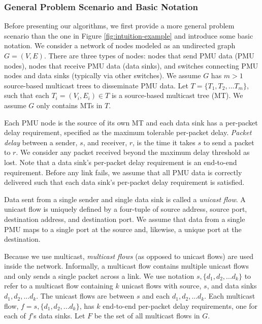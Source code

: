 \subsubsection{General Problem Scenario and Basic Notation}

Before presenting our algorithms, we first provide a more general problem scenario than the one in Figure \ref{fig:intuition-example} and introduce some basic notation.
We consider a network of nodes modeled as an undirected graph $G=(V,E)$.  There are three types of nodes:
nodes that send PMU data (PMU nodes), nodes that receive PMU data (data sinks), and switches connecting PMU nodes and data sinks (typically via other switches).
We assume $G$ has $m>1$ source-based multicast trees to disseminate PMU data.  Let $T = \{T_1,T_2, \dots T_m\}$, such that each $T_i = (V_i,E_i) \in T$ is a source-based multicast tree (MT). 
We assume $G$ only contains MTs in $T$. 

Each PMU node is the source of its own MT and each data sink has a per-packet delay requirement, specified as the maximum tolerable per-packet delay. 
\emph{Packet delay} between a sender, $s$, and receiver, $r$, is the time it takes $s$ to send a packet to $r$.  
We consider any packet received beyond the maximum delay threshold as lost. Note that a data sink's per-packet delay requirement is an end-to-end requirement.
Before any link fails, we assume that all PMU data is correctly delivered such that each data sink's per-packet delay requirement is satisfied. 

Data sent from a single sender and single data sink is called a \emph{unicast flow}.
A unicast flow is uniquely defined by a four-tuple of source address, source port, destination address, and destination port.  
We assume that data from a single PMU maps to a single port at the source and, likewise, a unique port at the destination. 

Because we use multicast, \emph{multicast flows} (as opposed to unicast flows) are used inside the network.  
Informally, a multicast flow contains multiple unicast flows and only sends a single packet across a link. 
We use notation $s,\{d_1,d_2, ... d_k\}$ to refer to a multicast flow containing $k$ unicast flows with source, $s$, and data sinks $d_1, d_2, ... d_k$.  The unicast flows are between $s$ and each $d_1, d_2, ... d_k$.
Each multicast flow, $f = s,\{d_1,d_2, ... d_k\}$, has $k$ end-to-end per-packet delay requirements, one for each of $f$'s data sinks. %
Let $F$ be the set of all multicast flows in $G$. 


